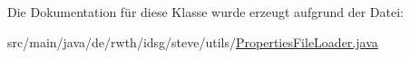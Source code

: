 Die Dokumentation für diese Klasse wurde erzeugt aufgrund der Datei\-:\begin{DoxyCompactItemize}
\item 
src/main/java/de/rwth/idsg/steve/utils/\hyperlink{_properties_file_loader_8java}{Properties\-File\-Loader.\-java}\end{DoxyCompactItemize}
